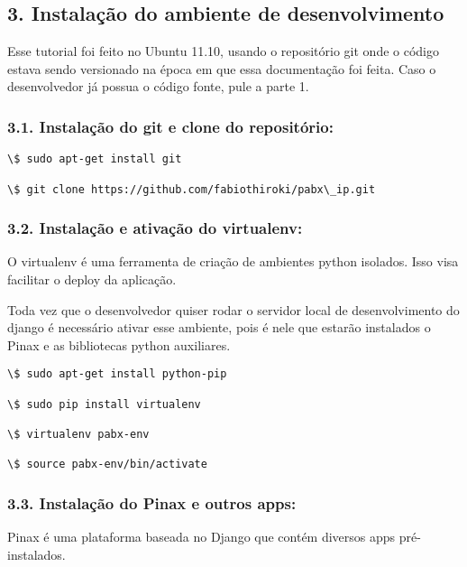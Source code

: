 \documentclass[letterpaper,10pt,brazil]{sphinxmanual}
\begin{document}
\subsection{3. Instalação do ambiente de desenvolvimento}
\label{inicio:instalacao-do-ambiente-de-desenvolvimento}
Esse tutorial foi feito no Ubuntu 11.10, usando o repositório git onde o código estava sendo versionado na época em que essa documentação foi feita. Caso o desenvolvedor já possua o código fonte, pule a parte 1.


\subsubsection{3.1. Instalação do git e clone do repositório:}
\label{inicio:instalacao-do-git-e-clone-do-repositorio}
\begin{Verbatim}[commandchars=\\\{\}]
\$ sudo apt-get install git

\$ git clone https://github.com/fabiothiroki/pabx\_ip.git
\end{Verbatim}


\subsubsection{3.2. Instalação e ativação do virtualenv:}
\label{inicio:instalacao-e-ativacao-do-virtualenv}
O virtualenv é uma ferramenta de criação de ambientes python isolados. Isso visa facilitar o deploy da aplicação.

Toda vez que o desenvolvedor quiser rodar o servidor local de desenvolvimento do django é necessário ativar esse ambiente, pois é nele que estarão instalados o Pinax e as bibliotecas python auxiliares.

\begin{Verbatim}[commandchars=\\\{\}]
\$ sudo apt-get install python-pip

\$ sudo pip install virtualenv

\$ virtualenv pabx-env

\$ source pabx-env/bin/activate
\end{Verbatim}


\subsubsection{3.3. Instalação do Pinax e outros apps:}
\label{inicio:instalacao-do-pinax-e-outros-apps}
Pinax é uma plataforma baseada no Django que contém diversos apps pré-instalados.
\end{document}
